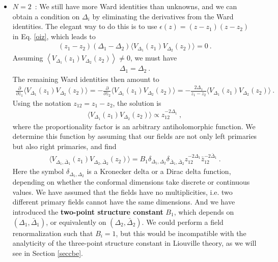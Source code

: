 \documentclass[12pt, a4paper, notitlepage, twoside]{report}
\numberwithin{equation}{section}
\theoremstyle{break}
\begin{document}
\begin{itemize}
\item $\boxed{N=2}$\ : We still have more Ward identities than unknowns, and we can obtain a condition on $\Delta_i$ by eliminating the derivatives from the Ward identities.
The elegant way to do this is to use $\epsilon(z)=(z-z_1)(z-z_2)$ in Eq. \eqref{oiz}, which leads to 
\begin{align}
 (z_1-z_2)(\Delta_1-\Delta_2)\Big\langle V_{\Delta_1}(z_1)V_{\Delta_2}(z_2)\Big\rangle =0\ .
\end{align}
Assuming $\left\langle V_{\Delta_1}(z_1)V_{\Delta_2}(z_2)\right\rangle\neq 0$, we must have 
\begin{align}
 \Delta_1 = \Delta_2 \ . 
\label{ded}
\end{align}
The remaining Ward identities then amount to 
\begin{align}
 \frac{\partial}{\partial z_1}\Big\langle V_{\Delta_1}(z_1)V_{\Delta_2}(z_2)\Big\rangle = - \frac{\partial}{\partial z_2}\Big\langle V_{\Delta_1}(z_1)V_{\Delta_2}(z_2)\Big\rangle = -\frac{2\Delta_1}{z_1-z_2} \Big\langle V_{\Delta_1}(z_1)V_{\Delta_2}(z_2)\Big\rangle\ .
\end{align}
Using the notation $z_{12}=z_1-z_2$, the solution is
\begin{align}
 \Big\langle V_{\Delta_1}(z_1)V_{\Delta_2}(z_2)\Big\rangle \propto z_{12}^{-2\Delta_1}\ ,
 \label{fzz}
\end{align}
where the proportionality factor is an arbitrary antiholomorphic function. We determine this function by assuming that our fields are not only left primaries but also right primaries, and find
\begin{align}
 \boxed{ \Big\langle V_{\Delta_1,\bar{\Delta}_1}(z_1) V_{\Delta_2,\bar{\Delta}_2}(z_2)\Big\rangle = B_{1}\delta_{\Delta_1,\Delta_2}\delta_{\bar{\Delta}_1,\bar{\Delta}_2} z_{12}^{-2\Delta_1}\bar z_{12}^{-2\bar \Delta_1} }\ .
 \label{eq:2pt}
\end{align}
Here the symbol $\delta_{\Delta_1,\Delta_2}$ is a Kronecker delta or a Dirac delta function, depending on whether the conformal dimensions take discrete or continuous values. We have assumed that the fields have no multiplicities, i.e. two different primary fields cannot have the same dimensions. And we have introduced the \textbf{two-point structure constant} $B_{1}$, which depends on $(\Delta_1,\bar\Delta_1)$, or equivalently on $(\Delta_2,\bar\Delta_2)$. We could perform a field renormalization such that $B_i=1$, but this would be incompatible with the analyticity of the three-point structure constant in Liouville theory, as we will see in Section \ref{seccbe}.


\end{itemize}
\end{document}
